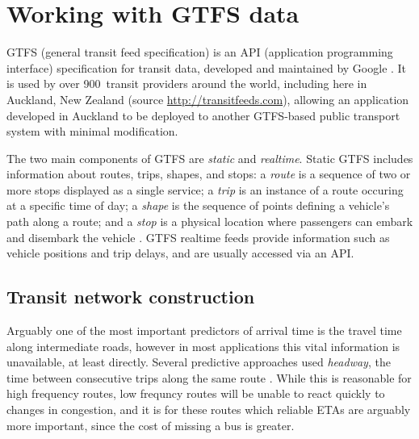 \section{Working with GTFS data}
\label{sec:gtfs}

GTFS (general transit feed specification)
is an API (application programming interface) specification for transit data,
developed and maintained by Google \citep{GoogleDevelopers_2006}.
It is used by over 900~transit providers around the world,
including here in Auckland, New Zealand
(source \url{http://transitfeeds.com}),
allowing an application developed in Auckland to
be deployed to another GTFS-based public transport system with minimal modification.


The two main components of GTFS are \emph{static} and \emph{realtime}.
Static GTFS includes information about routes, trips, shapes, and stops:
a \emph{route} is a sequence of two or more stops displayed as a single service;
a \emph{trip} is an instance of a route occuring at a specific time of day;
a \emph{shape} is the sequence of points defining a vehicle's path along a route;
and a \emph{stop} is a physical location where passengers can embark and disembark
the vehicle \citep{GoogleDevelopers_2006}.
GTFS realtime feeds provide information such as vehicle positions and trip delays,
and are usually accessed via an API.

\subsection{Transit network construction}
\label{sec:network_build}

Arguably one of the most important predictors of arrival time is
the travel time along intermediate roads,
however in most applications this vital information is unavailable,
at least directly. 
Several predictive approaches used \emph{headway},
the time between consecutive trips along the same route
\citep{Hans_2015}.
While this is reasonable for high frequency routes,
low frequncy routes will be unable to react quickly to changes in congestion,
and it is for these routes which reliable ETAs are arguably more important,
since the cost of missing a bus is greater.


